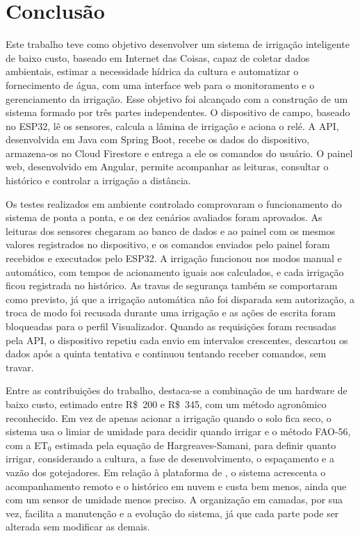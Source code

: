\chapter{Conclusão}
\label{textuais/conclusao}

Este trabalho teve como objetivo desenvolver um sistema de irrigação inteligente de baixo custo, baseado em Internet das Coisas, capaz de coletar dados ambientais, estimar a necessidade hídrica da cultura e automatizar o fornecimento de água, com uma interface web para o monitoramento e o gerenciamento da irrigação. Esse objetivo foi alcançado com a construção de um sistema formado por três partes independentes. O dispositivo de campo, baseado no ESP32, lê os sensores, calcula a lâmina de irrigação e aciona o relé. A API, desenvolvida em Java com Spring Boot, recebe os dados do dispositivo, armazena-os no Cloud Firestore e entrega a ele os comandos do usuário. O painel web, desenvolvido em Angular, permite acompanhar as leituras, consultar o histórico e controlar a irrigação a distância.

Os testes realizados em ambiente controlado comprovaram o funcionamento do sistema de ponta a ponta, e os dez cenários avaliados foram aprovados. As leituras dos sensores chegaram ao banco de dados e ao painel com os mesmos valores registrados no dispositivo, e os comandos enviados pelo painel foram recebidos e executados pelo ESP32. A irrigação funcionou nos modos manual e automático, com tempos de acionamento iguais aos calculados, e cada irrigação ficou registrada no histórico. As travas de segurança também se comportaram como previsto, já que a irrigação automática não foi disparada sem autorização, a troca de modo foi recusada durante uma irrigação e as ações de escrita foram bloqueadas para o perfil Visualizador. Quando as requisições foram recusadas pela API, o dispositivo repetiu cada envio em intervalos crescentes, descartou os dados após a quinta tentativa e continuou tentando receber comandos, sem travar.

Entre as contribuições do trabalho, destaca-se a combinação de um hardware de baixo custo, estimado entre R\$~200 e R\$~345, com um método agronômico reconhecido. Em vez de apenas acionar a irrigação quando o solo fica seco, o sistema usa o limiar de umidade para decidir quando irrigar e o método FAO-56, com a ET$_0$ estimada pela equação de Hargreaves-Samani, para definir quanto irrigar, considerando a cultura, a fase de desenvolvimento, o espaçamento e a vazão dos gotejadores. Em relação à plataforma de , o sistema acrescenta o acompanhamento remoto e o histórico em nuvem e custa bem menos, ainda que com um sensor de umidade menos preciso. A organização em camadas, por sua vez, facilita a manutenção e a evolução do sistema, já que cada parte pode ser alterada sem modificar as demais.

